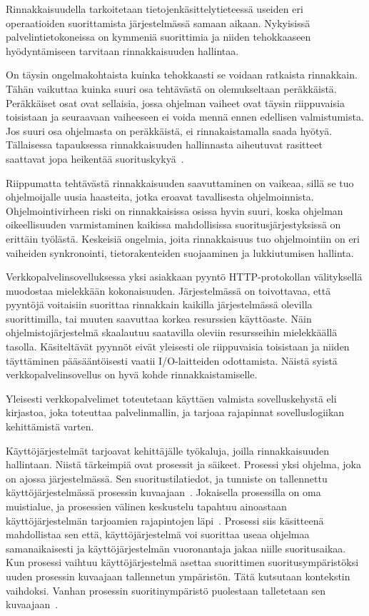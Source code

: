 \documentclass[finnish]{tktltiki2}
\theoremstyle{definition}
\theoremstyle{remark}
\begin{document}
Rinnakkaisuudella tarkoitetaan tietojenkäsittelytieteessä useiden
eri operaatioiden suorittamista järjestelmässä samaan aikaan.
Nykyisissä palvelintietokoneissa on kymmeniä suorittimia ja niiden tehokkaaseen
hyödyntämiseen tarvitaan rinnakkaisuuden hallintaa.

On täysin ongelmakohtaista kuinka tehokkaasti se voidaan ratkaista rinnakkain.
Tähän vaikuttaa kuinka suuri osa tehtävästä on olemukseltaan peräkkäistä.
Peräkkäiset osat ovat sellaisia, jossa ohjelman vaiheet ovat täysin
riippuvaisia toisistaan ja seuraavaan vaiheeseen ei voida mennä ennen edellisen
valmistumista. Jos suuri osa ohjelmasta on peräkkäistä, ei rinnakaistamalla
saada hyötyä. Tällaisessa tapauksessa rinnakkaisuuden hallinnasta aiheutuvat
rasitteet saattavat jopa heikentää suorituskykyä~\cite{stallings_operating_2018}.

Riippumatta tehtävästä rinnakkaisuuden saavuttaminen on vaikeaa,
sillä se tuo ohjelmoijalle uusia haasteita, jotka eroavat tavallisesta
ohjelmoinnista. Ohjelmointivirheen riski on rinnakkaisissa osissa hyvin suuri,
koska ohjelman oikeellisuuden varmistaminen kaikissa mahdollisissa
suoritusjärjestyksissä on erittäin työlästä.
Keskeisiä ongelmia, joita rinnakkaisuus tuo ohjelmointiin on eri vaiheiden
synkronointi, tietorakenteiden suojaaminen ja lukkiutumisen hallinta.

Verkkopalvelinsovelluksessa yksi asiakkaan pyyntö HTTP-protokollan välityksellä
muodostaa mielekkään kokonaisuuden.
Järjestelmässä on toivottavaa, että pyyntöjä voitaisiin suorittaa
rinnakkain kaikilla järjestelmässä olevilla suorittimilla, tai muuten
saavuttaa korkea resurssien käyttöaste.
Näin ohjelmistojärjestelmä skaalautuu saatavilla oleviin resursseihin
mielekkäällä tasolla. Käsiteltävät pyynnöt eivät yleisesti ole riippuvaisia
toisistaan ja niiden täyttäminen pääsääntöisesti vaatii I/O-laitteiden odottamista.
Näistä syistä verkkopalvelinsovellus on hyvä kohde rinnakkaistamiselle.

Yleisesti verkkopalvelimet toteutetaan käyttäen valmista sovelluskehystä eli kirjastoa,
joka toteuttaa palvelinmallin, ja tarjoaa rajapinnat sovelluslogiikan
kehittämistä varten.

Käyttöjärjestelmät tarjoavat kehittäjälle työkaluja, joilla rinnakkaisuuden hallintaan.
Niistä tärkeimpiä ovat prosessit ja säikeet.
Prosessi yksi ohjelma, joka on ajossa järjestelmässä. Sen suoritustilatiedot, ja tunniste on
tallennettu käyttöjärjestelmässä prosessin kuvaajaan~\cite{stallings_operating_2018}.
Jokaisella
prosessilla on oma muistialue, ja prosessien välinen keskustelu
tapahtuu ainoastaan käyttöjärjestelmän tarjoamien rajapintojen läpi~\cite{stallings_operating_2018}.
Prosessi siis käsitteenä mahdollistaa sen että, käyttöjärjestelmä
voi suorittaa useaa ohjelmaa samanaikaisesti ja käyttöjärjestelmän
vuoronantaja jakaa niille suoritusaikaa. Kun prosessi vaihtuu
käyttöjärjestelmä asettaa suorittimen suoritusympäristöksi
uuden prosessin kuvaajaan tallennetun ympäristön. Tätä kutsutaan kontekstin
vaihdoksi. Vanhan prosessin suoritinympäristö puolestaan talletetaan sen
kuvaajaan~\cite{stallings_operating_2018}.
\end{document}
